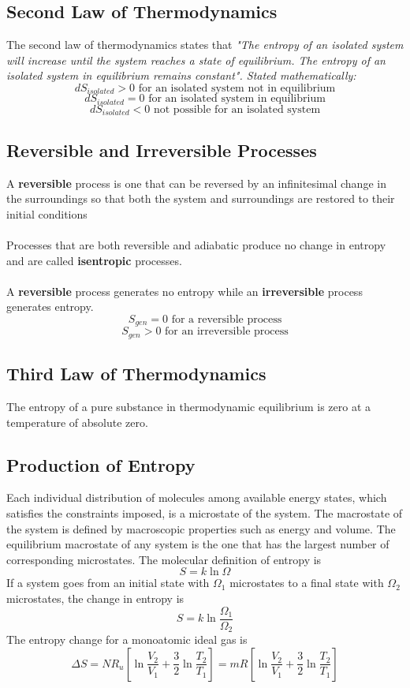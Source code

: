 \documentclass[11pt]{article}
\begin{document}
\subsection{Second Law of Thermodynamics}
The second law of thermodynamics states that \textit{"The entropy of an isolated system will increase until the system reaches a state of equilibrium. The entropy of an isolated system in equilibrium remains constant". Stated mathematically:}
$$ dS_{isolated} > 0 \text{ for an isolated system not in equilibrium}$$
$$ dS_{isolated} = 0 \text{ for an isolated system in equilibrium} $$
$$ dS_{isolated} < 0  \text{ not possible for an isolated system}$$
\subsection{Reversible and Irreversible Processes}
A \textbf{reversible} process is one that can be reversed by an infinitesimal change in the surroundings so that both the system and surroundings are restored to their initial conditions
\\ \\
Processes that are both reversible and adiabatic produce no change in entropy and are called \textbf{ isentropic }processes.
\\ \\
A \textbf{reversible} process generates no entropy while an \textbf{irreversible} process generates entropy.
$$ S_{gen} = 0 \text{ for a reversible process}$$
$$ S_{gen} > 0 \text{ for an irreversible process}$$

\subsection{Third Law of Thermodynamics}
The entropy of a pure substance in thermodynamic equilibrium is zero at a temperature of absolute zero.

\subsection{Production of Entropy}
Each individual distribution of molecules among available energy states, which satisfies the constraints imposed, is a microstate of the system. The macrostate of the system is defined by macroscopic properties such as energy and volume. The equilibrium macrostate of any system is the one that has the largest number of corresponding microstates. The molecular definition of entropy is 
$$ S = k \ln{\Omega} $$
If a system goes from an initial state with $\Omega_1$ microstates to a final state with $\Omega_2$ microstates, the change in entropy is
$$ S = k \ln{\frac{\Omega_1}{\Omega_2}} $$
The entropy change for a monoatomic ideal gas is
$$ \Delta S = NR_u\left[\ln{\frac{V_2}{V_1}}+\frac{3}{2}\ln{\frac{T_2}{T_1}} \right] = mR\left[\ln{\frac{V_2}{V_1}}+\frac{3}{2}\ln{\frac{T_2}{T_1}} \right]$$
\pagebreak
\end{document}
